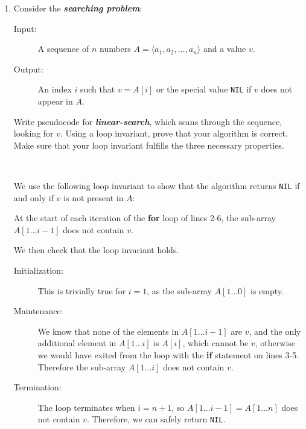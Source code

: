 \documentclass[Chapter02]{subfiles}
\begin{document}
\begin{enumerate}
		\item \label{exer:ch02-linear-search} Consider the \textbf{\textit{searching problem}}:
		\begin{description}
			\item[Input:] A sequence of $n$ numbers $A = \langle a_1, a_2, \dots, a_n \rangle$ and a value $v$.
			\item[Output:] An index $i$ such that $v = A[i]$ or the special value \texttt{NIL} if $v$ does not appear in $A$.
		\end{description}
		Write pseudocode for \textbf{\textit{linear-search}}, which scans through the sequence, looking for $v$. Using a loop invariant, prove that your algorithm is correct. Make sure that your loop invariant fulfills the three necessary properties.
		\begin{answer}
			\hfill\\
			\begin{algorithm}[H]

			\end{algorithm}
			We use the following loop invariant to show that the algorithm returns \texttt{NIL} if and only if $v$ is not present in $A$:

			\begin{addmargin}[2em]{2em}
				At the start of each iteration of the \textbf{for} loop of lines 2-6, the sub-array $A[1 \dots i - 1]$ does not contain $v$.
			\end{addmargin}

			We then check that the loop invariant holds.

			\begin{description}
				\item[Initialization:] This is trivially true for $i = 1$, as the sub-array $A[1 \dots 0]$ is empty.

				\item[Maintenance:] We know that none of the elements in $A[1 \dots i - 1]$ are $v$, and the only additional element in $A[1 \dots i]$ is $A[i]$, which cannot be $v$, otherwise we would have exited from the loop with the \textbf{if} statement on lines 3-5. Therefore the sub-array $A[1 \dots i]$ does not contain $v$.

				\item[Termination:] The loop terminates when $i = n + 1$, so $A[1 \dots i - 1] = A[1 \dots n]$ does not contain $v$. Therefore, we can safely return \texttt{NIL}.
			\end{description}
			

\end{answer}
\end{enumerate}
\end{document}
